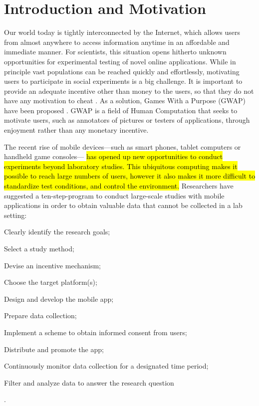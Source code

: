 \documentclass[preprint,authoryear,12pt]{elsarticle}
\newcommand{\hlc}[2][yellow]{ {\sethlcolor{#1} \hl{#2}} }
\begin{document}
\section{Introduction and Motivation}\label{sec:intro}


Our world today is tightly interconnected by the Internet, which allows users from almost anywhere to access information anytime in an affordable and immediate manner. For scientists, this situation opens hitherto unknown opportunities for experimental testing of novel online applications. While in principle vast populations can  be reached quickly and effortlessly, motivating users to participate in social experiments is a big challenge. It is important to provide an adequate incentive other than money to the users, so that they do not have any motivation to cheat \citep{Quinn}.
As a solution, Games With a Purpose (GWAP) have been proposed \citep{vonAhn2006Games}. GWAP is a field of Human Computation \citep{Yuen.2009,Krause+Smeddinck.2011} that seeks to motivate users, such as annotators of pictures or testers of applications, through enjoyment rather than any monetary incentive.

The recent rise of mobile devices---such as smart phones, tablet computers or handheld game consoles---
\hlc[green]{
has opened up new opportunities to conduct experiments beyond laboratory studies. This ubiquitous computing makes it possible to reach large numbers of users, however it also makes it more difficult to standardize test conditions, and control the environment.}
Researchers have suggested a ten-step-program to conduct large-scale studies with mobile applications in order to obtain valuable data that cannot be collected in a lab setting:
\begin{inparaenum}[\itshape 1\upshape)]\item Clearly identify the research goals; \item Select a study method; \item Devise an incentive mechanism;  \item Choose the target platform(s); \item Design and develop the mobile app; \item Prepare data collection; \item Implement a scheme to obtain informed consent from users; \item Distribute and promote the app; \item Continuously monitor data collection for a designated time period; \item Filter and analyze data to answer the research question \end{inparaenum} \citep{Henze2013}.
\end{document}
